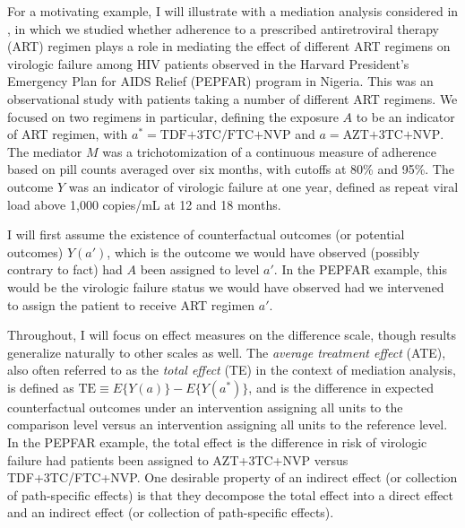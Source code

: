 \documentclass[12pt]{article}
\begin{document}
For a motivating example, I will illustrate with a mediation analysis considered in \cite{miles2017quantifying,miles2020semiparametric}, in which we studied whether adherence to a prescribed antiretroviral therapy (ART) regimen plays a role in mediating the effect of different ART regimens on virologic failure among HIV patients observed in the Harvard President's Emergency Plan for AIDS Relief (PEPFAR) program in Nigeria. This was an observational study with patients taking a number of different ART regimens. We focused on two regimens in particular, defining the exposure $A$ to be an indicator of ART regimen, with $a^*=\text{TDF+3TC/FTC+NVP}$ and $a=\text{AZT+3TC+NVP}$. %
The mediator $M$ was a trichotomization of a continuous measure of adherence based on pill counts averaged over six months, with cutoffs at 80\% and 95\%. The outcome $Y$ was an indicator of virologic failure at one year, defined as repeat viral load above 1,000 copies/mL at 12 and 18 months. %

I will first assume the existence of counterfactual outcomes (or potential outcomes) $Y(a')$, which is the outcome we would have observed (possibly contrary to fact) had $A$ been assigned to level $a'$. In the PEPFAR example, this would be the virologic failure status we would have observed had we intervened to assign the patient to receive ART regimen $a'$.

Throughout, I will focus on effect measures on the difference scale, though results generalize naturally to other scales as well. The \emph{average treatment effect} (ATE), also often referred to as the \emph{total effect} (TE) in the context of mediation analysis, is defined as $\text{TE}\equiv E\{Y(a)\}-E\{Y(a^*)\}$, and is the difference in expected counterfactual outcomes under an intervention assigning all units to the comparison level versus an intervention assigning all units to the reference level. In the PEPFAR example, the total effect is the difference in risk of virologic failure had patients been assigned to AZT+3TC+NVP versus TDF+3TC/FTC+NVP. One desirable property of an indirect effect (or collection of path-specific effects) is that they decompose the total effect into a direct effect and an indirect effect (or collection of path-specific effects).
\end{document}
